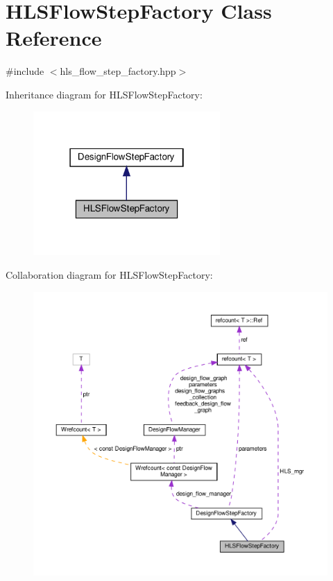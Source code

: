 \hypertarget{classHLSFlowStepFactory}{}\section{H\+L\+S\+Flow\+Step\+Factory Class Reference}
\label{classHLSFlowStepFactory}


{\ttfamily \#include $<$hls\+\_\+flow\+\_\+step\+\_\+factory.\+hpp$>$}



Inheritance diagram for H\+L\+S\+Flow\+Step\+Factory\+:
\nopagebreak
\begin{figure}[H]
\begin{center}
\leavevmode
\includegraphics[width=202pt]{d5/dea/classHLSFlowStepFactory__inherit__graph}
\end{center}
\end{figure}


Collaboration diagram for H\+L\+S\+Flow\+Step\+Factory\+:
\nopagebreak
\begin{figure}[H]
\begin{center}
\leavevmode
\includegraphics[width=350pt]{d6/d97/classHLSFlowStepFactory__coll__graph}
\end{center}
\end{figure}
